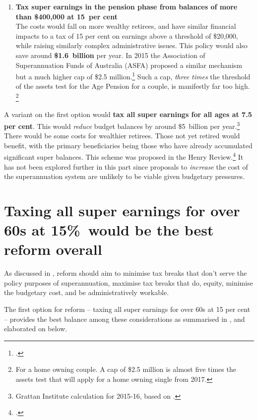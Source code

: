 \begin{enumerate}
%
\item \textbf{Tax super earnings in the pension phase from balances of more than \$400,000 at 15~per cent}\\
The costs would fall on more wealthy retirees, and have similar financial impacts to a tax of 15 per cent on earnings above a threshold of \$20,000, while raising similarly complex administrative issues. This policy would also save around \textbf{\$1.6~billion} per year. In 2015 the Association of Superannuation Funds of Australia (ASFA) proposed a similar mechanism but a much higher cap of \$2.5 million.\footcite{Clare2015b}  Such a cap, \emph{three times} the threshold of the assets test for the Age Pension for a couple, is manifestly far too high.%
\footnote{For a home owning couple. A cap of \$2.5 million is almost five times the assets test that will apply for a home owning single from 2017.}  
\end{enumerate}

A variant on the first option would \textbf{tax all super earnings for all ages at 7.5 per cent}. This would \emph{reduce} budget balances by around \$5~billion per year.\footnote{Grattan Institute calculation for 2015-16, based on \textcite{Treasury2010SuperAdditionalMaterial}.}  There would be some costs for wealthier retirees. Those not yet retired would benefit, with the primary beneficiaries being those who have already accumulated significant super balances. This scheme was proposed in the Henry Review.\footcite[][36]{HenryTaxReview2010}  It has not been explored further in this part since proposals to \emph{increase} the cost of the superannuation system are unlikely to be viable given budgetary pressures.

\section{Taxing all super earnings for over 60s at 15\%\ would be the best reform overall}\label{sec:SUPER-6-4}
As discussed in , reform should aim to minimise tax breaks that don’t serve the policy purposes of superannuation, maximise tax breaks that do, equity, minimise the budgetary cost, and be administratively workable.

The first option for reform – taxing all super earnings for over 60s at 15 per cent – provides the best balance among these considerations as summarised in , and elaborated on below.

